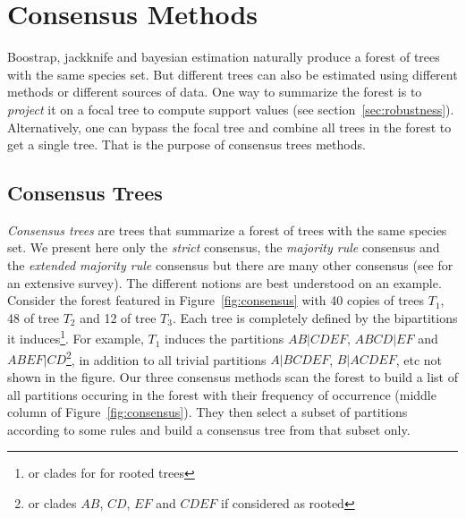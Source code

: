 \section{Consensus Methods} \label{sec:consensus}

Boostrap, jackknife and bayesian estimation naturally produce a forest of trees with the same species set. But different trees can also be estimated using different methods or different sources of data. One way to summarize the forest is to \emph{project} it on a focal tree to compute support values (see section~\ref{sec:robustness}). Alternatively, one can bypass the focal tree and combine all trees in the forest to get a single tree. That is the purpose of consensus trees methods. 

\subsection{Consensus Trees} \label{sec:consensus-tree}


\emph{Consensus trees} are trees that summarize a forest of trees with the same species set. We present here only the \emph{strict} consensus, the \emph{majority rule} consensus and the \emph{extended majority rule} consensus but there are many other consensus (see \citet{Bryant2003} for an extensive survey). The different notions are best understood on an example. Consider the forest featured in Figure~\ref{fig:consensus} with 40 copies of trees $T_1$, 48 of tree $T_2$ and 12 of tree $T_3$. Each tree is completely defined by the bipartitions it induces\footnote{or clades for for rooted trees}. For example, $T_1$ induces the partitions $AB|CDEF$, $ABCD|EF$ and $ABEF|CD$\footnote{or clades $AB$, $CD$, $EF$ and $CDEF$ if considered as rooted}, in addition to all trivial partitions $A|BCDEF$, $B|ACDEF$, etc not shown in the figure. Our three consensus methods scan the forest to build a list of all partitions occuring in the forest with their frequency of occurrence (middle column of Figure~\ref{fig:consensus}). They then select a subset of partitions according to some rules and build a consensus tree from that subset only. 

